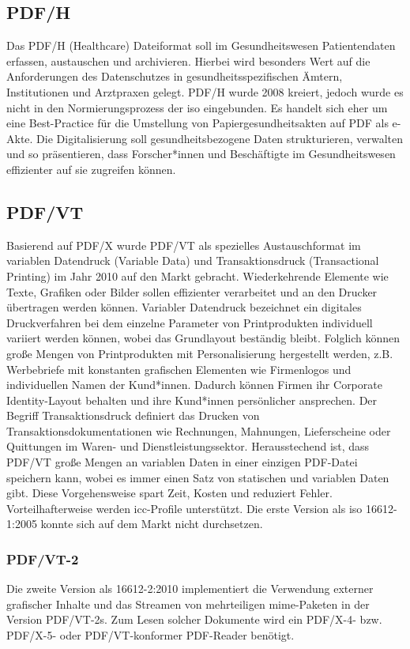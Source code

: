 \subsection{PDF/H}
Das PDF/H (Healthcare) Dateiformat soll im Gesundheitswesen Patientendaten erfassen, austauschen und archivieren. Hierbei wird besonders Wert auf die Anforderungen des Datenschutzes in gesundheitsspezifischen Ämtern, Institutionen und Arztpraxen gelegt. PDF/H wurde 2008 kreiert, jedoch wurde es nicht in den Normierungsprozess der \gls{iso} eingebunden. \cite{proj-consult} Es handelt sich eher um eine Best-Practice für die Umstellung von Papiergesundheitsakten auf PDF als e-Akte. Die Digitalisierung soll gesundheitsbezogene Daten strukturieren, verwalten und so präsentieren, dass Forscher*innen und Beschäftigte im Gesundheitswesen effizienter auf sie zugreifen können.


\subsection{PDF/VT}
Basierend auf PDF/X wurde PDF/VT als spezielles Austauschformat im variablen Datendruck (Variable Data) und Transaktionsdruck (Transactional Printing) im Jahr 2010 auf den Markt gebracht. \cite{adobe-pdf-vt} Wiederkehrende Elemente wie Texte, Grafiken oder Bilder sollen effizienter verarbeitet und an den Drucker übertragen werden können. \cite{adobe-pdf-e} Variabler Datendruck bezeichnet ein digitales Druckverfahren bei dem einzelne Parameter von Printprodukten individuell variiert werden können, wobei das Grundlayout beständig bleibt. Folglich können große Mengen von Printprodukten mit Personalisierung hergestellt werden, z.B. Werbebriefe mit konstanten grafischen Elementen wie Firmenlogos und individuellen Namen der Kund*innen. Dadurch können Firmen ihr Corporate Identity-Layout behalten und ihre Kund*innen persönlicher ansprechen. Der Begriff Transaktionsdruck definiert das Drucken von Transaktionsdokumentationen wie Rechnungen, Mahnungen, Lieferscheine oder Quittungen im Waren- und Dienstleistungssektor. Herausstechend ist, dass PDF/VT große Mengen an variablen Daten in einer einzigen PDF-Datei speichern kann, wobei es immer einen Satz von statischen und variablen Daten gibt. Diese Vorgehensweise spart Zeit, Kosten und reduziert Fehler. Vorteilhafterweise werden \gls{icc}-Profile unterstützt. \cite{adobe-pdf-vt} Die erste Version als \gls{iso} 16612-1:2005 konnte sich auf dem Markt nicht durchsetzen. \cite{proj-consult}

\subsubsection{PDF/VT-2}
Die zweite Version als  16612-2:2010 implementiert die Verwendung externer grafischer Inhalte und das Streamen von mehrteiligen \gls{mime}-Paketen in der Version PDF/VT-2s. Zum Lesen solcher Dokumente wird ein PDF/X-4- bzw. PDF/X-5- oder PDF/VT-konformer PDF-Reader benötigt. \cite{proj-consult}

